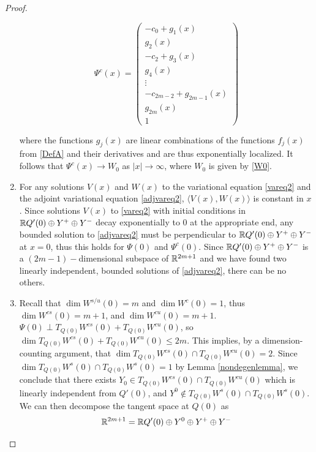 \documentclass[thesis.tex]{subfiles}
\begin{document}
\begin{lemma}
\begin{proof}
\begin{enumerate}
\[
\Psi^c(x) = \begin{pmatrix}
-c_0 + g_1(x) \\ g_2(x) \\
-c_2 + g_3(x) \\ g_4(x) \\
\vdots \\
-c_{2m-2} + g_{2m-1}(x) \\ g_{2m}(x) \\ 1
\end{pmatrix}
\]

where the functions $g_j(x)$ are linear combinations of the functions $f_j(x)$ from \eqref{DefA} and their derivatives and are thus exponentially localized. It follows that $\Psi^c(x) \rightarrow W_0$ as $|x| \rightarrow \infty$, where $W_0$ is given by \eqref{W0}.

\item For any solutions $V(x)$ and $W(x)$ to the variational equation \eqref{vareq2} and the adjoint variational equation \eqref{adjvareq2}, $\langle V(x), W(x) \rangle$ is constant in $x$. Since solutions $V(x)$ to \eqref{vareq2} with initial conditions in ${\mathbb R} Q'(0) \oplus Y^+ \oplus Y^-$ decay exponentially to 0 at the appropriate end, any bounded solution to \eqref{adjvareq2} must be perpendicular to ${\mathbb R} Q'(0) \oplus Y^+ \oplus Y^-$ at $x = 0$, thus this holds for $\Psi(0)$ and $\Psi^c(0)$. Since ${\mathbb R} Q'(0) \oplus Y^+ \oplus Y^-$ is a $(2m-1)-$dimensional subspace of ${\mathbb R}^{2m+1}$ and we have found two linearly independent, bounded solutions of \eqref{adjvareq2}, there can be no others.

\item Recall that $\dim W^{s/u}(0) = m$ and $\dim W^c(0) = 1$, thus $\dim W^{cs}(0) = m + 1$, and $\dim W^{cu}(0) = m + 1$. $\Psi(0) \perp T_{Q(0)}W^{cs}(0) + T_{Q(0)}W^{cu}(0)$, so $\dim T_{Q(0)}W^{cs}(0) + T_{Q(0)}W^{cu}(0) \leq 2m$. This implies, by a dimension-counting argument, that $\dim T_{Q(0)}W^{cs}(0) \cap T_{Q(0)}W^{cu}(0) = 2$. Since $\dim T_{Q(0)}W^s(0) \cap T_{Q(0)}W^s(0) = 1$ by Lemma \ref{nondegenlemma}, we conclude that there exists $Y_0 \in T_{Q(0)}W^{cs}(0) \cap T_{Q(0)}W^{cu}(0)$ which is linearly independent from $Q'(0)$, and $Y^0 \notin T_{Q(0)}W^s(0) \cap T_{Q(0)}W^s(0)$. We can then decompose the tangent space at $Q(0)$ as 
\[
{\mathbb R}^{2m + 1} = {\mathbb R} Q'(0) \oplus Y^0 \oplus Y^+ \oplus Y^-
\]



\end{enumerate}
\end{proof}
\end{lemma}
\end{document}

